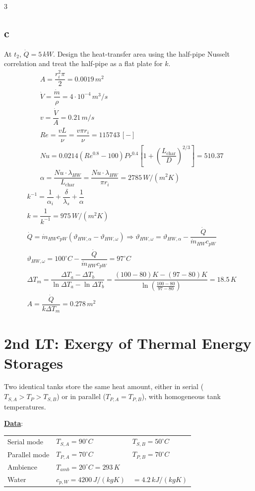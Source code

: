 \documentclass[9pt, landscape, a4paper]{article}
\begin{document}
\begin{multicols*}{3}
\subsection*{c}
At $t_2$, $\dot Q=5\,kW$. Design the heat-transfer area using the half-pipe
Nusselt correlation and treat the half-pipe as a flat plate for $k$.
\begingroup
\scriptsize
\begin{align*}
  & A = \dfrac{r_i^2\pi}{2}=0.0019\,m^2\\[.8ex]
  & \dot V = \dfrac{\dot m}{\rho}=4\cdot10^{-4}\,m^3/s\\[.8ex]
  & v = \dfrac{\dot V}{A}=0.21\,m/s\\[.8ex]
  & Re = \dfrac{vL}{\nu}=\dfrac{v\pi r_i}{\nu}=115743\,[-]\\[.8ex]
  & Nu = 0.0214\left(Re^{0.8}-100\right)Pr^{0.4}
  \left[1+{\left(\dfrac{L_\text{char}}{D}\right)}^{2/3}\right]=510.37\\[.8ex]
  & \alpha = \dfrac{Nu\cdot\lambda_{HW}}{L_\text{char}}
   = \dfrac{Nu\cdot\lambda_{HW}}{\pi r_i}=2785\,W/(m^2K)
\end{align*}
\begin{align*}
  & k^{-1} = \dfrac{1}{\alpha_i}+\dfrac{\delta}{\lambda_s}+\dfrac{1}{\alpha}\\[.8ex]
  & k = \dfrac{1}{k^{-1}}=975\,W/(m^2K)\\[.8ex]
  & \dot Q = \dot m_{HW}c_{pW}
  \left(\vartheta_{HW,\alpha}-\vartheta_{HW,\omega}\right)
  \Longrightarrow \vartheta_{HW,\omega} = \vartheta_{HW,\alpha}
  - \dfrac{\dot Q}{\dot m_{HW}c_{pW}}\\[.6ex]
  & \vartheta_{HW,\omega}
  = 100^\circ C
  - \dfrac{\dot Q}{\dot m_{HW}c_{pW}}
  = 97^\circ C\\[.8ex]
  & \Delta T_m
  = \dfrac{\Delta T_a-\Delta T_b}{\ln\Delta T_a-\ln\Delta T_b}
   = \dfrac{\left(100-80\right)K-\left(97-80\right)K}
   {\ln\left(\frac{100-80}{97-80}\right)}
   = 18.5\,K\\[.8ex]
  & A = \dfrac{\dot Q}{k\Delta T_m}
   = 0.278\,m^2
\end{align*}
\endgroup

\section{2nd LT: Exergy of Thermal Energy Storages}
Two identical tanks store the same heat amount, either in serial
($T_{S,A}>T_P>T_{S,B}$) or in parallel ($T_{P,A}=T_{P,B}$), with homogeneous
tank temperatures.

\textbf{\underline{Data}}:
\begin{center}
\setlength{\tabcolsep}{3pt}
\renewcommand{\arraystretch}{1.2}
\begin{tabular}{@{}lll@{}}
  Serial mode & $T_{S,A}=90^\circ C$ & $T_{S,B}=50^\circ C$\\
  Parallel mode & $T_{P,A}=70^\circ C$ & $T_{P,B}=70^\circ C$\\
  Ambience & $T_{amb}=20^\circ C=293\,K$ & \\
  Water & $c_{p,W}=4200\,J/(kgK)$ & $=4.2\,kJ/(kgK)$
\end{tabular}
\end{center}
\renewcommand{\arraystretch}{1}


\end{multicols*}
\end{document}
